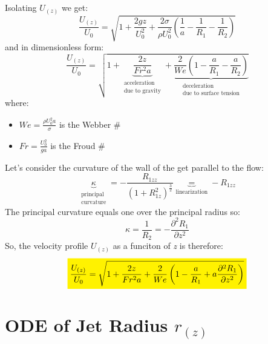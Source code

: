 \documentclass[11pt, a4paper]{article}
\begin{document}
Isolating $U_{\left(z\right)}$ we get:
\begin{equation}
    \frac{U_{\left(z\right)}}{U_0}=\sqrt{1+\frac{2gz}{U_0^2}+\frac{2\sigma}{\rho U_0^2}\left(\frac{1}{a}-\frac{1}{R_1}-\frac{1}{R_2}\right)}
\end{equation}
and in dimensionless form:
\begin{equation}
    \frac{U_{\left(z\right)}}{U_0}=\sqrt{1+\underbrace{\frac{2z}{Fr^2a}}_{\substack{\text{acceleration}\\\text{due to gravity}}}+\underbrace{\frac{2}{We}\left(1-\frac{a}{R_1}-\frac{a}{R_2}\right)}_{\substack{\text{deceleration}\\\text{due to surface tension}}}}
\end{equation}
where:
\begin{itemize}
    \item $\displaystyle We=\frac{\rho U_0^2a}{\sigma}$ is the Webber \#
    \item $\displaystyle Fr=\frac{U_0^2}{ga}$ is the Froud \#
\end{itemize}
Let's consider the curvature of the wall of the get parallel to the flow:
\begin{equation}
    \underbrace{\kappa}_{\substack{\text{principal}\\\text{curvature}}}=-\frac{R_{1zz}}{\left(1+R_{1z}^2\right)^{\frac{3}{2}}}\underbrace{=}_{\text{linearization}}-R_{1zz}
\end{equation}
The principal curvature equals one over the principal radius so:
\begin{equation}
    \kappa=\frac{1}{R_2}=-\frac{\partial^2 R_1}{\partial z^2}
\end{equation}
So, the velocity profile $U_{\left(z\right)}$ as a funciton of \emph{z} is therefore:
\begin{equation}
    \colorbox{yellow}{$\displaystyle\frac{U_{\left(z\right)}}{U_0}=\sqrt{1+\frac{2z}{Fr^2a}+\frac{2}{We}\left(1-\frac{a}{R_1}+a\frac{\partial^2 R_1}{\partial z^2}\right)}$}
\end{equation}

\newpage

\section{ODE of Jet Radius $r_{\left(z\right)}$}
\end{document}
